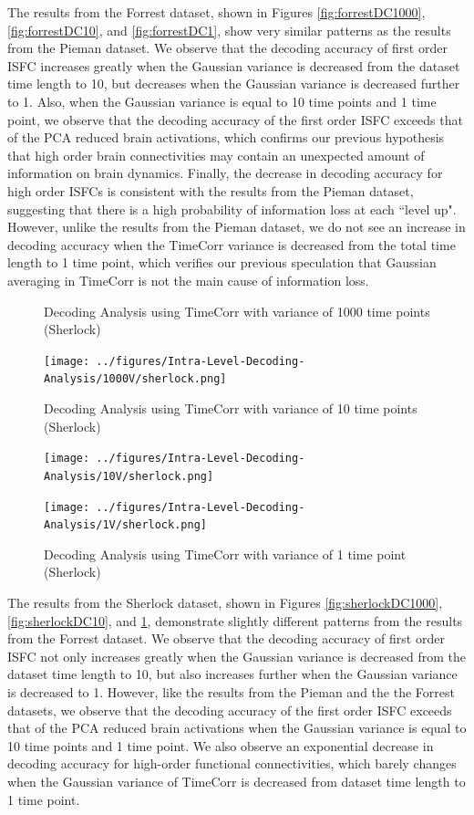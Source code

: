 \documentclass[11pt]{article}
\begin{document}
The results from the Forrest dataset, shown in Figures \ref{fig:forrestDC1000}, \ref{fig:forrestDC10}, and \ref{fig:forrestDC1}, show very similar patterns as the results from the Pieman dataset. We observe that the decoding accuracy of first order ISFC increases greatly when the Gaussian variance is decreased from the dataset time length to 10, but decreases when the Gaussian variance is decreased further to 1. Also, when the Gaussian variance is equal to 10 time points and 1 time point, we observe that the decoding accuracy of the first order ISFC exceeds that of the PCA reduced brain activations, which confirms our previous hypothesis that high order brain connectivities may contain an unexpected amount of information on brain dynamics. Finally, the decrease in decoding accuracy for high order ISFCs is consistent with the results from the Pieman dataset, suggesting that there is a high probability of information loss at each ``level up". However, unlike the results from the Pieman dataset, we do not see an increase in decoding accuracy when the TimeCorr variance is decreased from the total time length to 1 time point, which verifies our previous speculation that Gaussian averaging in TimeCorr is not the main cause of information loss.

\begin{figure}[!htb]
\caption{Decoding Analysis using TimeCorr with variance of 1000 time points (Sherlock)}
\centering
\texttt{[image: ../figures/Intra-Level-Decoding-Analysis/1000V/sherlock.png]}
\label{fig:sherlockDC1000}
\caption{Decoding Analysis using TimeCorr with variance of 10 time points (Sherlock)}
\centering
\texttt{[image: ../figures/Intra-Level-Decoding-Analysis/10V/sherlock.png]}
\label{fig:sherlockDC10}
\caption{Decoding Analysis using TimeCorr with variance of 1 time point (Sherlock)}
\centering
\texttt{[image: ../figures/Intra-Level-Decoding-Analysis/1V/sherlock.png]}
\label{fig:sherlockDC1}
\end{figure}

The results from the Sherlock dataset, shown in Figures \ref{fig:sherlockDC1000}, \ref{fig:sherlockDC10}, and \ref{fig:sherlockDC1}, demonstrate slightly different patterns from the results from the Forrest dataset. We observe that the decoding accuracy of first order ISFC not only increases greatly when the Gaussian variance is decreased from the dataset time length to 10, but also increases further when the Gaussian variance is decreased to 1. However, like the results from the Pieman and the the Forrest datasets, we observe that the decoding accuracy of the first order ISFC exceeds that of the PCA reduced brain activations when the Gaussian variance is equal to 10 time points and 1 time point. We also observe an exponential decrease in decoding accuracy for high-order functional connectivities, which barely changes when the Gaussian variance of TimeCorr is decreased from dataset time length to 1 time point.
\end{document}
